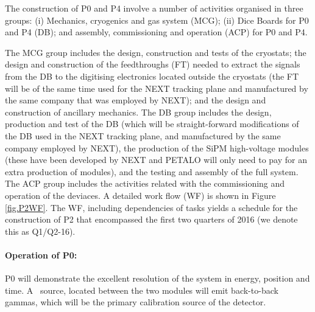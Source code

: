 The construction of P0 and P4 involve a number of activities  organised in three groups: (i) Mechanics, cryogenics and gas system (MCG);  (ii) Dice Boards for P0 and P4 (DB);  and assembly, commissioning and operation (ACP) for P0 and P4. 

The MCG group includes the design, construction and tests of the cryostats; the design and construction of the feedthroughs (FT) needed to extract the signals from the DB to the digitising electronics located outside the cryostats (the FT will be of the same time used for the NEXT tracking plane and manufactured by the same company that was employed by NEXT);  and the design and construction of ancillary mechanics. The DB group includes the design, production and test of the DB (which will be straight-forward modifications of the DB used in the NEXT tracking plane, and manufactured by the same company employed by NEXT), the production of the SiPM high-voltage modules (these have been developed by NEXT and PETALO will only need to pay for an extra production of modules), and the testing and assembly of the full system. The ACP group includes the activities related with the commissioning and operation of the deviaces. A detailed work flow (WF) is shown in Figure \ref{fig.P2WF}. The WF, including dependencies of tasks yields a schedule for the construction of P2 that encompassed the first two quarters of 2016 (we denote this as Q1/Q2-16). 

\paragraph{Operation of P0:}


P0 will demonstrate the excellent resolution of the system in energy, position and time. A \NA\ source, located between the two modules will emit back-to-back gammas, which will be the primary calibration source of the detector. 

